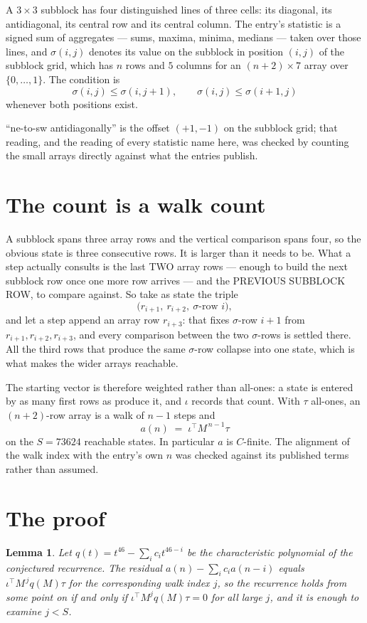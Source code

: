 \documentclass[11pt,a4paper]{article}
\theoremstyle{plain}
\newtheorem{lemma}[theorem]{Lemma}
\theoremstyle{definition}
\begin{document}
A $3\times3$ subblock has four distinguished lines of three cells: its diagonal, its
antidiagonal, its central row and its central column. The entry's statistic is a signed sum of
aggregates --- sums, maxima, minima, medians --- taken over those lines, and $\sigma(i,j)$
denotes its value on the subblock in position $(i,j)$ of the subblock grid, which has $n$ rows
and $5$ columns for an $(n+2)\times7$ array over $\{0,\dots,1\}$. The condition is
\[
\sigma(i,j)\le\sigma(i,j+1),\qquad \sigma(i,j)\le\sigma(i+1,j)
\]
whenever both positions exist.

``ne-to-sw antidiagonally'' is the offset $(+1,-1)$ on the subblock grid; that reading, and
the reading of every statistic name here, was checked by counting the small arrays directly
against what the entries publish.

\section{The count is a walk count}

A subblock spans three array rows and the vertical comparison spans four, so the obvious state
is three consecutive rows. It is larger than it needs to be. What a step actually consults is
the last TWO array rows --- enough to build the next subblock row once one more row arrives ---
and the PREVIOUS SUBBLOCK ROW, to compare against. So take as state the triple
\[
\bigl(r_{i+1},\ r_{i+2},\ \sigma\text{-row }i\bigr),
\]
and let a step append an array row $r_{i+3}$: that fixes $\sigma$-row $i+1$ from
$r_{i+1},r_{i+2},r_{i+3}$, and every comparison between the two $\sigma$-rows is settled
there. All the third rows that produce the same $\sigma$-row collapse into one state, which is
what makes the wider arrays reachable.

The starting vector is therefore weighted rather than all-ones: a state is entered by as many
first rows as produce it, and $\iota$ records that count. With $\tau$ all-ones, an
$(n+2)$-row array is a walk of $n-1$ steps and
\[
a(n)\;=\;\iota^{\!\top}M^{\,n-1}\tau
\]
on the $S=73624$ reachable states. In particular $a$ is $C$-finite. The alignment of the walk
index with the entry's own $n$ was checked against its published terms rather than assumed.

\section{The proof}

\begin{lemma}\label{lem:crit}
Let $q(t)=t^{46}-\sum_i c_it^{46-i}$ be the characteristic polynomial of the
conjectured recurrence. The residual $a(n)-\sum_ic_ia(n-i)$ equals
$\iota^{\!\top}M^{\,j}q(M)\tau$ for the corresponding walk index $j$, so the recurrence
holds from some point on if and only if $\iota^{\!\top}M^{j}q(M)\tau=0$ for all large $j$,
and it is enough to examine $j<S$.
\end{lemma}
\end{document}
